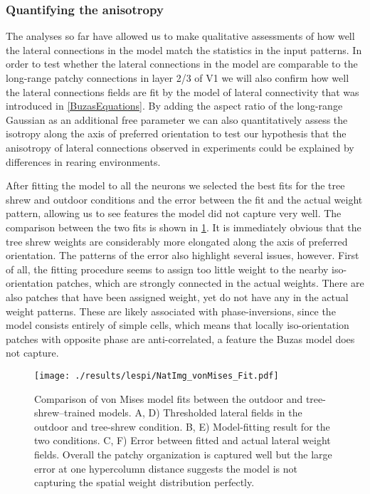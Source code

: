 \subsubsection*{Quantifying the anisotropy}

The analyses so far have allowed us to make qualitative assessments of
how well the lateral connections in the model match the statistics in
the input patterns. In order to test whether the lateral connections
in the model are comparable to the long-range patchy connections in
layer 2/3 of V1 we will also confirm how well the lateral connections
fields are fit by the \cite{Buzas2006} model of lateral connectivity
that was introduced in \ref{BuzasEquations}. By adding the aspect
ratio of the long-range Gaussian as an additional free parameter we
can also quantitatively assess the isotropy along the axis of
preferred orientation to test our hypothesis that the anisotropy of
lateral connections observed in experiments \citep{Bosking1997} could
be explained by differences in rearing environments.

After fitting the model to all the neurons we selected the best fits
for the tree shrew and outdoor conditions and the error between the
fit and the actual weight pattern, allowing us to see features the
model did not capture very well. The comparison between the two fits
is shown in \ref{NatImgvonMises}. It is immediately obvious that the
tree shrew weights are considerably more elongated along the axis of
preferred orientation. The patterns of the error also highlight
several issues, however.  First of all, the fitting procedure seems to
assign too little weight to the nearby iso-orientation patches, which
are strongly connected in the actual weights. There are also patches
that have been assigned weight, yet do not have any in the actual
weight patterns. These are likely associated with phase-inversions,
since the model consists entirely of simple cells, which means that
locally iso-orientation patches with opposite phase are
anti-correlated, a feature the Buzas model does not capture.

\begin{figure}
	\centering
        \texttt{[image: ./results/lespi/NatImg\_vonMises\_Fit.pdf]}
	\caption[Comparison of \cite{Buzas2006} von Mises model fit
      between the outdoor and treeshrew trained models.]{Comparison of
      \cite{Buzas2006} von Mises model fits between the outdoor and
      tree-shrew--trained models. A, D) Thresholded lateral fields in
      the outdoor and tree-shrew condition. B, E) Model-fitting result
      for the two conditions. C, F) Error between fitted and actual
      lateral weight fields. Overall the patchy organization is
      captured well but the large error at one hypercolumn distance
      suggests the model is not capturing the spatial weight
      distribution perfectly.}
	\label{NatImgvonMises}
\end{figure}

